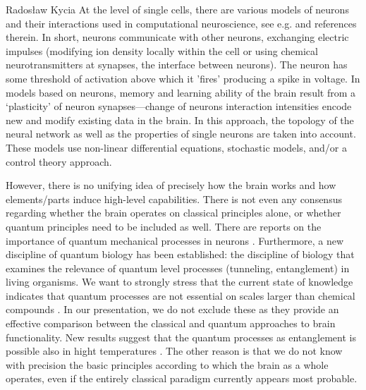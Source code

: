 \begin{artengenv}{Radosław Kycia}
At the level of single cells, there are various models of neurons and their interactions used in computational neuroscience, see e.g. \parencite{ModellingNeurons} and references therein. In short, neurons communicate with other neurons, exchanging electric impulses (modifying ion density locally within the cell or using chemical neurotransmitters at synapses, the interface between neurons). The neuron has some threshold of activation above which it 'fires' producing a spike in voltage. In models based on neurons, memory and learning ability of the brain result from a `plasticity' of neuron synapses---change of neurons interaction intensities encode new and modify existing data in the brain. In this approach, the topology of the neural network as well as the properties of single neurons are taken into account. These models use non-linear differential equations, stochastic models, and/or a control theory approach.

However, there is no unifying idea of precisely how the brain works and how elements/parts induce high-level capabilities. There is not even any consensus regarding whether the brain operates on classical principles alone, or whether quantum principles need to be included as well. There are reports on the importance of quantum mechanical processes in neurons  \parencite{EmperorsNewMind, PenroseQuantum1, PenroseQuantum2}. Furthermore, a new discipline of quantum biology \parencite{QuantumBilogy} has been established: the discipline of biology that examines the relevance of quantum level processes (tunneling, entanglement) in living organisms. We want to strongly stress that the current state of knowledge indicates that quantum processes are not essential on scales larger than chemical compounds \parencite{QuantumBilogy}. In our presentation, we do not exclude these as they provide an effective comparison between the classical and quantum approaches to brain functionality. New results suggest that the quantum processes as entanglement is possible also in hight temperatures \parencite{HightTempEntantgelemnt}. The other reason is that we do not know with precision the basic principles according to which the brain as a whole operates, even if the entirely classical paradigm currently appears most probable.



\end{artengenv}
